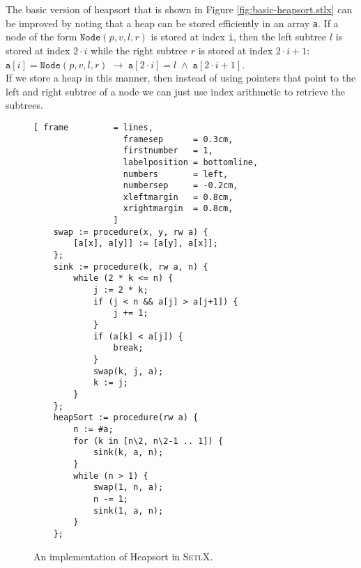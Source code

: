 The basic version of heapsort that is shown in Figure \ref{fig:basic-heapsort.stlx} can be improved
by noting that a heap can be stored efficiently in an array \texttt{a}.  If a node of the form
$\texttt{Node}(p, v, l, r)$ is stored at index \texttt{i}, then the left subtree $l$ is stored at
index $2 \cdot i$ while the right subtree $r$ is stored at index $2 \cdot i + 1$:
\\[0.2cm]
\hspace*{1.3cm}
$\mathtt{a}[i] = \texttt{Node}(p, v, l, r) \;\rightarrow\; \mathtt{a}[2\cdot i] = l \;\wedge\; \mathtt{a}[2\cdot i+1]$.
\\[0.2cm]
If we store a heap in this manner, then instead of using pointers that point to the left and right
subtree of a node we can just use index arithmetic to retrieve the subtrees.  


 
\begin{figure}[!ht]
\centering
\begin{Verbatim}[ frame         = lines, 
                  framesep      = 0.3cm, 
                  firstnumber   = 1,
                  labelposition = bottomline,
                  numbers       = left,
                  numbersep     = -0.2cm,
                  xleftmargin   = 0.8cm,
                  xrightmargin  = 0.8cm,
                ]
    swap := procedure(x, y, rw a) {
        [a[x], a[y]] := [a[y], a[x]];
    };
    sink := procedure(k, rw a, n) {
        while (2 * k <= n) {
            j := 2 * k;
            if (j < n && a[j] > a[j+1]) {
                j += 1;
            }
            if (a[k] < a[j]) {
                break;
            }
            swap(k, j, a);
            k := j;
        }
    };
    heapSort := procedure(rw a) {
        n := #a;
        for (k in [n\2, n\2-1 .. 1]) {
            sink(k, a, n);
        }
        while (n > 1) {
            swap(1, n, a);
            n -= 1;
            sink(1, a, n);
        }
    };
\end{Verbatim}
\vspace*{-0.3cm}
\caption{An implementation of Heapsort in \textsc{SetlX}.}
\label{fig:heap-sort.stlx}
\end{figure}

